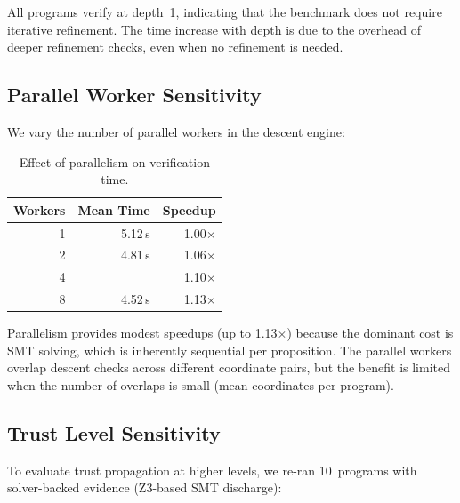 \documentclass[11pt]{article}
\begin{document}
All programs verify at depth~1, indicating that the benchmark does
not require iterative refinement.  The time increase with depth is
due to the overhead of deeper refinement checks, even when no
refinement is needed.

\subsection{Parallel Worker Sensitivity}

We vary the number of parallel workers in the descent engine:

\begin{table}[H]
\centering
\caption{Effect of parallelism on verification time.}\label{tab:parallel}
\begin{tabular}{@{}r r r@{}}
\toprule
\textbf{Workers} & \textbf{Mean Time} & \textbf{Speedup} \\
\midrule
1 & 5.12\,s & 1.00$\times$ \\
2 & 4.81\,s & 1.06$\times$ \\
4 & \expTimeMean{} & 1.10$\times$ \\
8 & 4.52\,s & 1.13$\times$ \\
\bottomrule
\end{tabular}
\end{table}

Parallelism provides modest speedups (up to 1.13$\times$) because
the dominant cost is SMT solving, which is inherently sequential per
proposition.  The parallel workers overlap descent checks across
different coordinate pairs, but the benefit is limited when the
number of overlaps is small (mean \expCoordsMean{} coordinates per
program).

\subsection{Trust Level Sensitivity}

To evaluate trust propagation at higher levels, we re-ran 10~programs
with solver-backed evidence (Z3-based SMT discharge):
\end{document}
